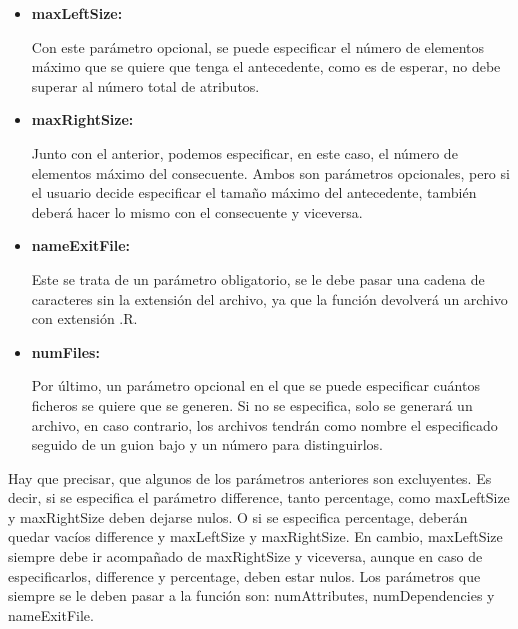\begin{itemize}
        Cabe especificar, que tanto este par\'ametro, como el anterior, se tratan de tama\~nos m\'aximos, es decir, que no todas las implicaciones 
        van a tener la diferencia exacta que se le especifique entre antecedente y consecuente, sino que el n\'umero o porcentaje ser\'a la 
        mayor diferencia que se encontrar\'a en el sistema de implicaciones.


        \item \textbf{maxLeftSize:}

        Con este par\'ametro opcional, se puede especificar el n\'umero de elementos m\'aximo que se quiere que tenga el antecedente, como 
        es de esperar, no debe superar al n\'umero total de atributos.


        \item \textbf{maxRightSize:}

        Junto con el anterior, podemos especificar, en este caso, el n\'umero de elementos m\'aximo del consecuente. Ambos son par\'ametros 
        opcionales, pero si el usuario decide especificar el tama\~no m\'aximo del antecedente, tambi\'en deber\'a hacer lo mismo con el 
        consecuente y viceversa.


        \item \textbf{nameExitFile:}

        Este se trata de un par\'ametro obligatorio, se le debe pasar una cadena de caracteres sin la extensi\'on del archivo, ya que 
        la funci\'on devolver\'a un archivo con extensi\'on .R.


        \item \textbf{numFiles:}

        Por \'ultimo, un par\'ametro opcional en el que se puede especificar cu\'antos ficheros se quiere que se generen. Si no se especifica, 
        solo se generar\'a un archivo, en caso contrario, los archivos tendr\'an como nombre el especificado seguido de un guion bajo y un n\'umero 
        para distinguirlos.

    \end{itemize}

    Hay que precisar, que algunos de los par\'ametros anteriores son excluyentes. Es decir, si se especifica el par\'ametro difference, tanto 
    percentage, como maxLeftSize y maxRightSize deben dejarse nulos. O si se especifica percentage, deber\'an quedar vac\'ios difference y 
    maxLeftSize y maxRightSize. 
    En cambio, maxLeftSize siempre debe ir acompa\~nado de maxRightSize y viceversa, aunque en caso de especificarlos, difference y percentage, 
    deben estar nulos.
    Los par\'ametros que siempre se le deben pasar a la funci\'on son: numAttributes, numDependencies y nameExitFile.

